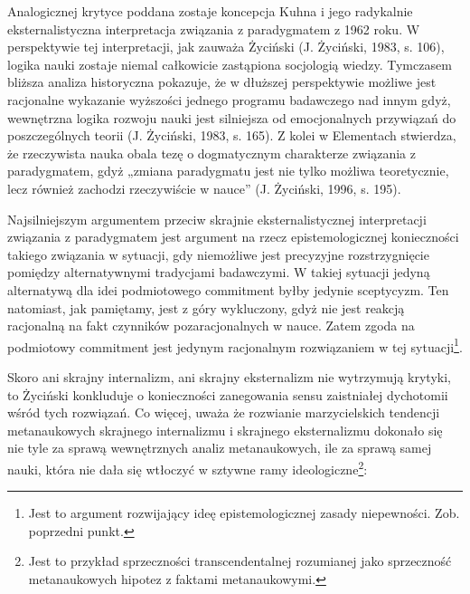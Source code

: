 \documentclass{article}
\begin{document}
Analogicznej krytyce poddana zostaje koncepcja Kuhna i jego radykalnie eksternalistyczna interpretacja związania z
paradygmatem z 1962 roku. W perspektywie tej interpretacji, jak zauważa Życiński \label{ref:RNDaETzNFGzG9}(J. Życiński,
1983, s. 106), logika nauki zostaje niemal całkowicie zastąpiona socjologią wiedzy. Tymczasem bliższa analiza
historyczna pokazuje, że w dłuższej perspektywie możliwe jest racjonalne wykazanie wyższości jednego programu
badawczego nad innym gdyż, wewnętrzna logika rozwoju nauki jest silniejsza od emocjonalnych przywiązań do
poszczególnych teorii \label{ref:RND184R61G3Ny}(J. Życiński, 1983, s. 165). Z kolei w Elementach stwierdza, że
rzeczywista nauka obala tezę o dogmatycznym charakterze związania z paradygmatem, gdyż „zmiana paradygmatu jest nie
tylko możliwa teoretycznie, lecz również zachodzi rzeczywiście w nauce” \label{ref:RND8iXlMhyTs3}(J. Życiński, 1996, s.
195).

Najsilniejszym argumentem przeciw skrajnie eksternalistycznej interpretacji związania z paradygmatem jest argument na
rzecz epistemologicznej konieczności takiego związania w sytuacji, gdy niemożliwe jest precyzyjne rozstrzygnięcie
pomiędzy alternatywnymi tradycjami badawczymi. W takiej sytuacji jedyną alternatywą dla idei podmiotowego commitment
byłby jedynie sceptycyzm. Ten natomiast, jak pamiętamy, jest z góry wykluczony, gdyż nie jest reakcją racjonalną na
fakt czynników pozaracjonalnych w nauce. Zatem zgoda na podmiotowy commitment jest jedynym racjonalnym rozwiązaniem w
tej sytuacji\footnote{Jest to argument rozwijający ideę epistemologicznej zasady niepewności. Zob. poprzedni punkt. }.

Skoro ani skrajny internalizm, ani skrajny eksternalizm nie wytrzymują krytyki, to Życiński konkluduje o konieczności
zanegowania sensu zaistniałej dychotomii wśród tych rozwiązań. Co więcej, uważa że rozwianie marzycielskich tendencji
metanaukowych skrajnego internalizmu i skrajnego eksternalizmu dokonało się nie tyle za sprawą wewnętrznych analiz
metanaukowych, ile za sprawą samej nauki, która nie dała się wtłoczyć w sztywne ramy ideologiczne\footnote{Jest to
przykład sprzeczności transcendentalnej rozumianej jako sprzeczność metanaukowych hipotez z faktami metanaukowymi.}:
\end{document}
